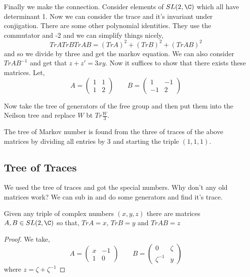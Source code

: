 \documentclass{article}
\begin{document}
Finally we make the connection. Consider elements of $SL(2, \C)$ which all have determinant 1. Now we can consider the trace and it's invariant under conjigation. There are some other polynomial identities. They use the commutator and -2 and we can simplify things nicely,
$$ Tr A Tr B Tr AB = (Tr A)^2 + (Tr B)^2 + (Tr AB)^2 $$
and so we divide by three and get the markov equation. We can also consider $Tr AB^{-1}$ and get that $z + z' = 3xy$. Now it suffices to show that there exists these matrices. Let,
$$ A = \begin{pmatrix}
  1 & 1 \\ 1 & 2
\end{pmatrix} \qquad B = \begin{pmatrix}
  1 & -1 \\ -1 & 2
\end{pmatrix} $$

Now take the tree of generators of the free group and then put them into the Neilson tree and replace $W$ bt $Tr \frac{W}{3}$.\\

\begin{thm}
  The tree of Markov number is found from the three of traces of the above matrices by dividing all entries by 3 and starting the triple $(1, 1, 1)$.
\end{thm}

\subsection{Tree of Traces}
We used the tree of traces and got the special numbers. Why don't any old matrices work? We can sub in and do some generators and find it's trace.

\begin{nlemma}
  Given any triple of complex numbers $(x, y, z)$ there are matrices $A, B \in SL(2, \C)$ so that,
  $Tr A = x$, $Tr B = y$ and $Tr AB = z$
\end{nlemma}
\begin{proof}
  We take,
  $$ A = \begin{pmatrix}
    x & -1 \\ 1 & 0
  \end{pmatrix} \qquad B = \begin{pmatrix}
    0 & \zeta \\ \zeta^{-1} & y
  \end{pmatrix}$$
  where $z = \zeta + \zeta^{-1}$
\end{proof}
\end{document}
